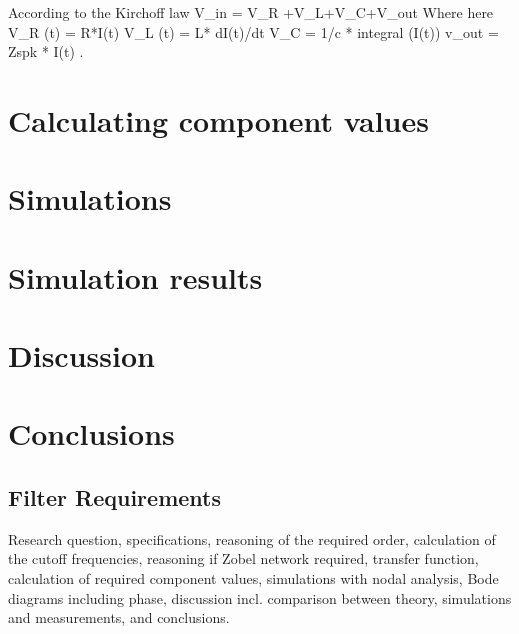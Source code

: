 According to the Kirchoff law 
V_in = V_R +V_L+V_C+V_out
\newline
Where here
\newline 
V_R (t) = R*I(t)  
\newline
V_L (t) = L* dI(t)/dt
\newline 
V_C = 1/c * integral (I(t))
\newline 
v_out = Zspk * I(t)
.




\section{Calculating component values}

\section{Simulations}

\section{Simulation results} %

 

\section{Discussion}

\section{Conclusions}

\subsection{Filter Requirements}
 Research question, specifications, reasoning of the required order, calculation
of the cutoff frequencies, reasoning if Zobel network required, transfer function, calculation of
required component values, simulations with nodal analysis, Bode diagrams including phase, discussion incl. comparison between theory, simulations and measurements, and conclusions.




